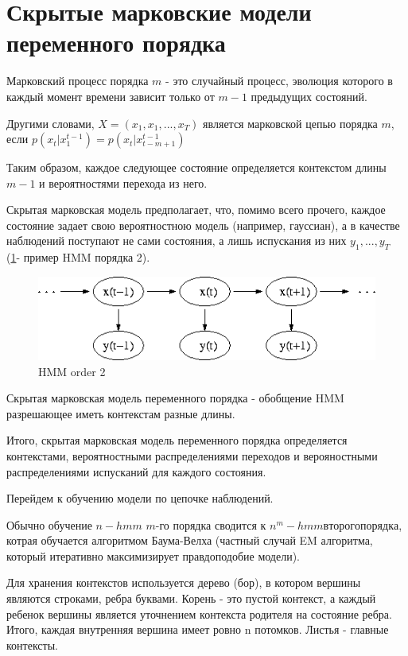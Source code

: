 \documentclass[10pt,a4paper]{article}
\begin{document}
\section{Скрытые марковские модели переменного порядка}

Марковский процесс порядка $ m $ - это случайный процесс, эволюция которого в каждый момент времени зависит только от $ m-1 $ предыдущих состояний.

Другими словами, $ X = (x_{1}, x_{1}, ..., x_{T}) $ является марковской цепью порядка $ m $,
если $ p(x_{t}|x_{1}^{t-1}) = p(x_{t}|x_{t-m+1}^{t-1})$ 

Таким образом, каждое следующее состояние определяется контекстом длины $ m-1 $ и вероятностями перехода из него.

Скрытая марковская модель предполагает, что, помимо всего прочего, каждое состояние задает свою вероятностною модель (например, гауссиан), а в качестве наблюдений поступают не сами состояния, а лишь испускания из них $y_{1},...,y_{T}$ (\ref{ris:image}- пример HMM порядка 2). 
\begin{figure}[hbtp]
\includegraphics[scale=0.4]{Hmm_temporal_bayesian_net.png}
\centering
\caption{HMM order 2}
\label{ris:image}
\end{figure}


Скрытая марковская модель переменного порядка - обобщение HMM разрешающее иметь контекстам разные длины.
 
Итого, скрытая марковская модель переменного порядка определяется контекстами, вероятностными распределениями переходов и верояностными распределениями испусканий для каждого состояния.

Перейдем к обучению модели по цепочке наблюдений.

Обычно обучение $ n-hmm$ $ m $-го порядка сводится к $ n^{m}-hmm второго порядка$, котрая обучается алгоритмом Баума-Велха (частный случай EM алгоритма, который итеративно максимизирует правдоподобие модели).

Для хранения контекстов используется дерево (бор), в котором вершины являются строками, ребра буквами. Корень - это пустой контекст, а каждый ребенок вершины является уточнением контекста родителя на состояние ребра. 
Итого, каждая внутренняя вершина имеет ровно n потомков. Листья - главные контексты. 
\end{document}
